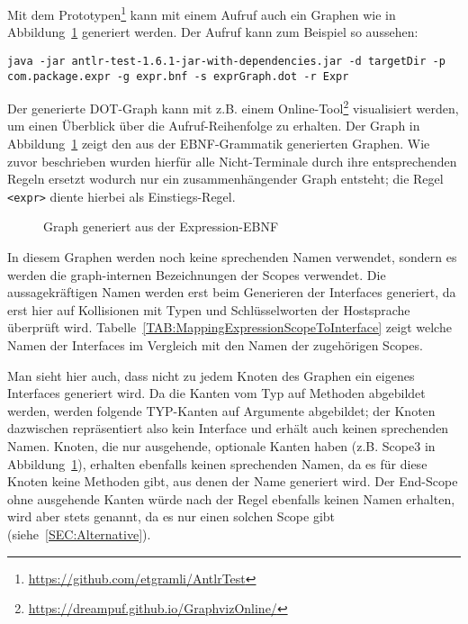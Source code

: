 \documentclass[../InterneDSLs.tex]{subfiles}
\begin{document}
Mit dem Prototypen\footnote{\url{https://github.com/etgramli/AntlrTest}} kann mit einem Aufruf auch ein Graphen wie in Abbildung~\ref{FIG:ExprGraph} generiert werden. Der Aufruf kann zum Beispiel so aussehen:
\begin{lstlisting}
java -jar antlr-test-1.6.1-jar-with-dependencies.jar -d targetDir -p com.package.expr -g expr.bnf -s exprGraph.dot -r Expr
\end{lstlisting}

\begin{figure}
	
\end{figure}

Der generierte DOT-Graph kann mit z.B. einem Online-Tool\footnote{\url{https://dreampuf.github.io/GraphvizOnline/}} visualisiert werden, um einen Überblick über die Aufruf-Reihenfolge zu erhalten. Der Graph in Abbildung~\ref{FIG:ExprGraph} zeigt den aus der EBNF-Grammatik generierten Graphen. Wie zuvor beschrieben wurden hierfür alle Nicht-Terminale durch ihre entsprechenden Regeln ersetzt wodurch nur ein zusammenhängender Graph entsteht; die Regel \verb|<expr>| diente hierbei als Einstiegs-Regel.

\begin{figure}[ht]
\centering
\resizebox{\linewidth}{!}{}
\caption{Graph generiert aus der Expression-EBNF}
\label{FIG:ExprGraph}
\end{figure}

In diesem Graphen werden noch keine sprechenden Namen verwendet, sondern es werden die graph-internen Bezeichnungen der Scopes verwendet. Die aussagekräftigen Namen werden erst beim Generieren der Interfaces generiert, da erst hier auf Kollisionen mit Typen und Schlüsselworten der Hostsprache überprüft wird. Tabelle~\ref{TAB:MappingExpressionScopeToInterface} zeigt welche Namen der Interfaces im Vergleich mit den Namen der zugehörigen Scopes.

Man sieht hier auch, dass nicht zu jedem Knoten des Graphen ein eigenes Interfaces generiert wird. Da die Kanten vom Typ  auf Methoden abgebildet werden, werden folgende TYP-Kanten auf Argumente abgebildet; der Knoten dazwischen repräsentiert also kein Interface und erhält auch keinen sprechenden Namen. Knoten, die nur ausgehende, optionale Kanten haben (z.B. Scope3 in Abbildung~\ref{FIG:ExprGraph}), erhalten ebenfalls keinen sprechenden Namen, da es für diese Knoten keine Methoden gibt, aus denen der Name generiert wird. Der End-Scope ohne ausgehende Kanten würde nach der Regel ebenfalls keinen Namen erhalten, wird aber stets  genannt, da es nur einen solchen Scope gibt (siehe~\ref{SEC:Alternative}).
\end{document}
